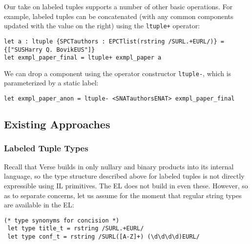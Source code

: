 Our take on labeled tuples supports a number of other basic operations. For example, labeled tuples can be concatenated (with any common components updated with the value on the right) using the \lstinline{ltuple+} operator:
\begin{lstlisting}[numbers=none]
let a : ltuple {SPCTauthors : EPCTlist(rstring /SURL.+EURL/)} = {["SUSHarry Q. BovikEUS"]}
let exmpl_paper_final = ltuple+ exmpl_paper a
\end{lstlisting}
We can drop a component using the operator constructor \lstinline{ltuple-}, which is parameterized by a static label:
\begin{lstlisting}[numbers=none]
let exmpl_paper_anon = ltuple- <SNATauthorsENAT> exmpl_paper_final
\end{lstlisting}

\subsection{Existing Approaches}\label{sec:metamodules-related}
\subsubsection{Labeled Tuple Types}
Recall that Verse builds in only nullary and binary products into its internal language, so the type structure described above for labeled tuples  is not directly expressible using IL primitives. The EL does not build in even these. However, so as to separate concerns, let us assume for the moment that regular string types are available in the EL: %
\begin{lstlisting}[numbers=none]
 (* type synonyms for concision *)
 let type title_t = rstring /SURL.+EURL/
 let type conf_t = rstring /SURL([A-Z]+) (\d\d\d\d)EURL/
\end{lstlisting}

